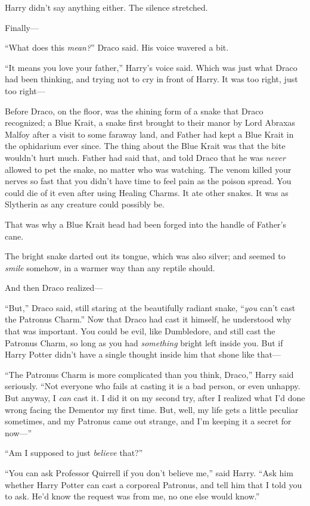 Harry didn’t say anything either. The silence stretched.

Finally—

“What does this \emph{mean?}” Draco said. His voice wavered a bit.

“It means you love your father,” Harry’s voice said. Which was just what Draco had been thinking, and trying not to cry in front of Harry. It was too right, just too right—

Before Draco, on the floor, was the shining form of a snake that Draco recognized; a Blue Krait, a snake first brought to their manor by Lord Abraxas Malfoy after a visit to some faraway land, and Father had kept a Blue Krait in the ophidarium ever since. The thing about the Blue Krait was that the bite wouldn’t hurt much. Father had said that, and told Draco that he was \emph{never} allowed to pet the snake, no matter who was watching. The venom killed your nerves so fast that you didn’t have time to feel pain as the poison spread. You could die of it even after using Healing Charms. It ate other snakes. It was as Slytherin as any creature could possibly be.

That was why a Blue Krait head had been forged into the handle of Father’s cane.

The bright snake darted out its tongue, which was also silver; and seemed to \emph{smile} somehow, in a warmer way than any reptile should.

And then Draco realized—

“But,” Draco said, still staring at the beautifully radiant snake, “\emph{you} can’t cast the Patronus Charm.” Now that Draco had cast it himself, he understood why that was important. You could be evil, like Dumbledore, and still cast the Patronus Charm, so long as you had \emph{something} bright left inside you. But if Harry Potter didn’t have a single thought inside him that shone like that—

“The Patronus Charm is more complicated than you think, Draco,” Harry said seriously. “Not everyone who fails at casting it is a bad person, or even unhappy. But anyway, I \emph{can} cast it. I did it on my second try, after I realized what I’d done wrong facing the Dementor my first time. But, well, my life gets a little peculiar sometimes, and my Patronus came out strange, and I’m keeping it a secret for now—”

“Am I supposed to just \emph{believe} that?”

“You can ask Professor Quirrell if you don’t believe me,” said Harry. “Ask him whether Harry Potter can cast a corporeal Patronus, and tell him that I told you to ask. He’d know the request was from me, no one else would know.”


